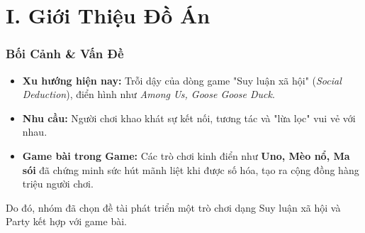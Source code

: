 \section{I. Giới Thiệu Đồ Án}

\begin{frame}
\frametitle{Bối Cảnh \& Vấn Đề}
\begin{itemize}
    \item \textbf{Xu hướng hiện nay:} Trỗi dậy của dòng game "Suy luận xã hội" (\textit{Social Deduction}), điển hình như \textit{Among Us, Goose Goose Duck}.
    \item \textbf{Nhu cầu:} Người chơi khao khát sự kết nối, tương tác và "lừa lọc" vui vẻ với nhau.
    
    \item \textbf{Game bài trong Game:} Các trò chơi kinh điển như \textbf{Uno, Mèo nổ, Ma sói} đã chứng minh sức hút mãnh liệt khi được số hóa, tạo ra cộng đồng hàng triệu người chơi.
\end{itemize}
\vspace{0.5cm}
    Do đó, nhóm đã chọn đề tài phát triển một trò chơi dạng Suy luận xã hội và Party kết hợp với game bài.
\end{frame}

